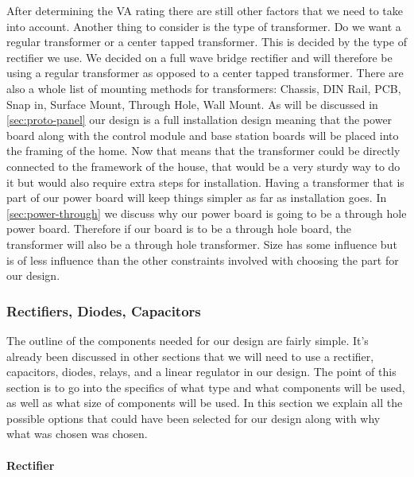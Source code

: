 After determining the VA rating there are still other factors
that we need to take into account. Another thing to consider is the type of
transformer. Do we want a regular transformer or a center tapped transformer.
This is decided by the type of rectifier we use. We decided on a full wave
bridge rectifier and will therefore be using a regular transformer as opposed
to a center tapped transformer. There are also a whole list of mounting
methods for transformers: Chassis, DIN Rail, PCB, Snap in, Surface Mount,
Through Hole, Wall Mount. As will be discussed in \autoref{sec:proto-panel} our
design is a full installation design meaning that the power board along with
the control module and base station boards will be placed into the framing of
the home. Now that means that the transformer could be directly connected to
the framework of the house, that would be a very sturdy way to do it but
would also require extra steps for installation. Having a transformer that is
part of our power board will keep things simpler as far as installation goes.
In \autoref{sec:power-through} we discuss why our power board is going to be a
through hole power board.  Therefore if our board is to be a through hole
board, the transformer will also be a through hole transformer. Size has some
influence but is of less influence than the other constraints involved with
choosing the part for our design.

\subsubsection{Rectifiers, Diodes, Capacitors}
The outline of the components needed for our design are fairly simple. It{}'s
already been discussed in other sections that we will need to use a rectifier,
capacitors, diodes, relays, and a linear regulator in our design. The point of
this section is to go into the specifics of what type and what components will
be used, as well as what size of components will be used. In this section we
explain all the possible options that could have been selected for our design
along with why what was chosen was chosen.

\paragraph{Rectifier}

